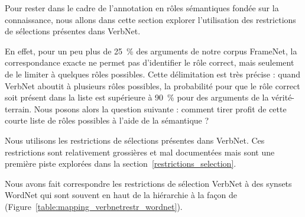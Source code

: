 Pour rester dans le cadre de l'annotation en rôles sémantiques fondée sur la
connaissance, nous allons dans cette section explorer l'utilisation des
restrictions de sélections présentes dans VerbNet.

En effet, pour un peu plus de 25~\% des arguments de notre corpus FrameNet, la
correspondance exacte ne permet pas d'identifier le rôle correct, mais
seulement de le limiter à quelques rôles possibles. Cette délimitation est très
précise : quand VerbNet aboutit à plusieurs rôles possibles, la probabilité
pour que le rôle correct soit présent dans la liste est supérieure à 90~\% pour
des arguments de la vérité-terrain. Nous posons alors la question suivante : comment tirer
profit de cette courte liste de rôles possibles à l'aide de la sémantique ?

Nous utilisons les restrictions de sélections présentes dans VerbNet. Ces
restrictions sont relativement grossières et mal documentées mais sont une
première piste explorées dans la section~\ref{restrictions_selection}.

Nous avons fait correspondre les restrictions de sélection VerbNet à des
synsets WordNet qui sont souvent en haut de la hiérarchie à la façon de
\citep{shi2005putting} (Figure~\ref{table:mapping_verbnetrestr_wordnet}).

